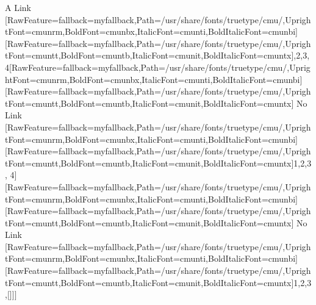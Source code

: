 \label{0}

A Link
{\ttfamily \allowbreak{}\setmainfont{cmuntt.ttf}[RawFeature={fallback=myfallback},Path=/usr/share/fonts/truetype/cmu/,UprightFont=cmunrm,BoldFont=cmunbx,ItalicFont=cmunti,BoldItalicFont=cmunbi]\setmonofont{cmuntt.ttf}[RawFeature={fallback=myfallback},Path=/usr/share/fonts/truetype/cmu/,UprightFont=cmuntt,BoldFont=cmuntb,ItalicFont=cmunit,BoldItalicFont=cmuntx],2,3,4\footnotemark[1]}\allowbreak{}\setmainfont{cmunrm.ttf}[RawFeature={fallback=myfallback},Path=/usr/share/fonts/truetype/cmu/,UprightFont=cmunrm,BoldFont=cmunbx,ItalicFont=cmunti,BoldItalicFont=cmunbi]\setmonofont{cmunrm.ttf}[RawFeature={fallback=myfallback},Path=/usr/share/fonts/truetype/cmu/,UprightFont=cmuntt,BoldFont=cmuntb,ItalicFont=cmunit,BoldItalicFont=cmuntx]
No Link
{\ttfamily \allowbreak{}\setmainfont{cmuntt.ttf}[RawFeature={fallback=myfallback},Path=/usr/share/fonts/truetype/cmu/,UprightFont=cmunrm,BoldFont=cmunbx,ItalicFont=cmunti,BoldItalicFont=cmunbi]\setmonofont{cmuntt.ttf}[RawFeature={fallback=myfallback},Path=/usr/share/fonts/truetype/cmu/,UprightFont=cmuntt,BoldFont=cmuntb,ItalicFont=cmunit,BoldItalicFont=cmuntx]\ttfamily {$\text{[}$}1,2,3, 4{$\text{]}$}}\allowbreak{}\setmainfont{cmunrm.ttf}[RawFeature={fallback=myfallback},Path=/usr/share/fonts/truetype/cmu/,UprightFont=cmunrm,BoldFont=cmunbx,ItalicFont=cmunti,BoldItalicFont=cmunbi]\setmonofont{cmunrm.ttf}[RawFeature={fallback=myfallback},Path=/usr/share/fonts/truetype/cmu/,UprightFont=cmuntt,BoldFont=cmuntb,ItalicFont=cmunit,BoldItalicFont=cmuntx]
No Link
{\ttfamily \allowbreak{}\setmainfont{cmuntt.ttf}[RawFeature={fallback=myfallback},Path=/usr/share/fonts/truetype/cmu/,UprightFont=cmunrm,BoldFont=cmunbx,ItalicFont=cmunti,BoldItalicFont=cmunbi]\setmonofont{cmuntt.ttf}[RawFeature={fallback=myfallback},Path=/usr/share/fonts/truetype/cmu/,UprightFont=cmuntt,BoldFont=cmuntb,ItalicFont=cmunit,BoldItalicFont=cmuntx]\ttfamily {$\text{[}$}{$\text{[}$}1,2,3,{$\text{[}$}{$\text{]}$}{$\text{]}$}{$\text{]}$}}

